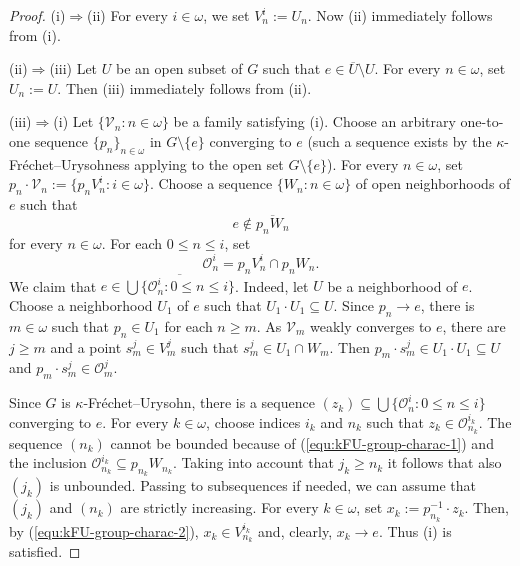 \documentclass[preprint,11pt]{elsarticle}
\theoremstyle{definition}
\theoremstyle{remark}
\numberwithin{equation}{section}
\numberwithin{theorem}{section}
\newcommand{\w}{\omega}
\newcommand{\Ra}{\Rightarrow}
\newcommand{\SM}{{\setminus}}
\begin{document}
\begin{proof}
(i)$\Ra$(ii) For every $i\in \w$, we set $V^i_n:=U_n$. Now (ii) immediately follows from (i).
\smallskip

(ii)$\Ra$(iii) Let $U$ be an open subset of $G$ such that $e\in \overline{U}\SM U$. For every $n\in\w$, set $U_n:=U$. Then (iii) immediately follows from (ii).
\smallskip

(iii)$\Ra$(i) Let $\{\mathcal{V}_n: n\in \w\}$  be a family satisfying (i). Choose an arbitrary one-to-one sequence $\{p_n\}_{n\in\w}$ in $G\SM \{e\}$  converging to $e$ (such a sequence exists by the $\kappa$-Fr\'{e}chet--Urysohness applying to the open set $G\SM\{e\}$). For every $n\in\w$, set $p_n\cdot\mathcal{V}_n:=\{p_n V^i_n: i\in \w\}$. Choose a sequence $\{W_n: n\in \w\}$ of open neighborhoods of $e$ such that
\begin{equation} \label{equ:kFU-group-charac-1}
e\not\in \overline{p_n W_n}
\end{equation}
for every $n\in \w$. For each $0\leq n\leq i$, set
\begin{equation} \label{equ:kFU-group-charac-2}
\mathcal{O}^i_n=p_nV^i_n\cap p_nW_n.
\end{equation}
We claim that $e\in \overline{\bigcup \{\mathcal{O}^i_n: 0\leq n\leq i\}}$.  Indeed, let $U$ be a neighborhood of $e$. Choose a neighborhood $U_1$ of $e$ such that $U_1\cdot U_1\subseteq U$. Since $p_n\to e$, there is $m\in\w$ such that $p_n\in U_1$ for each $n\geq m$.  As $\mathcal{V}_m$ weakly converges to $e$, there are $j\geq m $ and a point $s_m^j\in V_m^j$ such that $s_m^j\in U_1\cap W_m$. Then $p_m\cdot s_m^j\in U_1\cdot U_1\subseteq U$ and $p_m\cdot s_m^j\in \mathcal{O}^j_m$.
\smallskip

Since $G$ is $\kappa$-Fr\'{e}chet--Urysohn, there is a sequence $(z_k)\subseteq \bigcup \{\mathcal{O}^i_n: 0\leq n\leq i\}$ converging to $e$. For every $k\in\w$, choose indices  $i_k$ and $n_k$ such that $z_k\in \mathcal{O}^{i_k}_{n_k}$. The sequence $(n_k)$ cannot be bounded because of (\ref{equ:kFU-group-charac-1}) and the inclusion $\mathcal{O}^{i_k}_{n_k} \subseteq p_{n_k}W_{n_k}$. Taking into account that $j_k\geq n_k$ it follows that also $(j_k)$ is unbounded. Passing to subsequences if needed, we can assume that $(j_k)$ and $(n_k)$ are strictly increasing.  For every $k\in\w$, set $x_k:= p_{n_k}^{-1}\cdot z_k $. Then, by (\ref{equ:kFU-group-charac-2}), $x_k\in V^{i_k}_{n_k}$ and, clearly, $x_k\to e$. Thus (i) is satisfied.
\end{proof}
\end{document}
